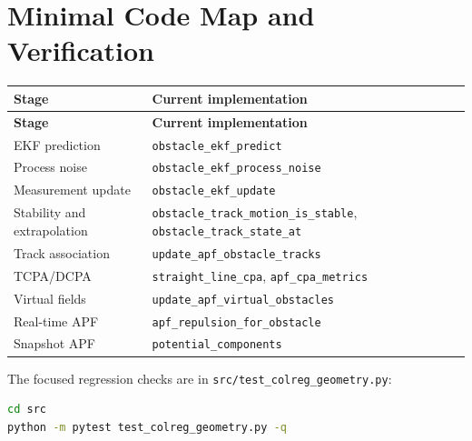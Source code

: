 \documentclass[11pt,a4paper]{article}
\begin{document}
\section{Minimal Code Map and Verification}
\begin{longtable}{>{\raggedright\arraybackslash}p{}p{}}
\toprule
\textbf{Stage} & \textbf{Current implementation} \\
\midrule
\endfirsthead
\toprule
\textbf{Stage} & \textbf{Current implementation} \\
\midrule
\endhead
EKF prediction & \texttt{obstacle\_ekf\_predict} \\
Process noise & \texttt{obstacle\_ekf\_process\_noise} \\
Measurement update & \texttt{obstacle\_ekf\_update} \\
Stability and extrapolation & \texttt{obstacle\_track\_motion\_is\_stable}, \texttt{obstacle\_track\_state\_at} \\
Track association & \texttt{update\_apf\_obstacle\_tracks} \\
TCPA/DCPA & \texttt{straight\_line\_cpa}, \texttt{apf\_cpa\_metrics} \\
Virtual fields & \texttt{update\_apf\_virtual\_obstacles} \\
Real-time APF & \texttt{apf\_repulsion\_for\_obstacle} \\
Snapshot APF & \texttt{potential\_components} \\
\bottomrule
\end{longtable}

The focused regression checks are in \texttt{src/test\_colreg\_geometry.py}:
\begin{lstlisting}[language=bash]
cd src
python -m pytest test_colreg_geometry.py -q
\end{lstlisting}
\end{document}

